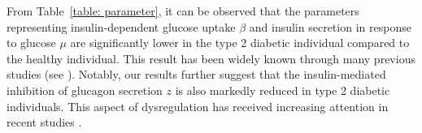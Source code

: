 \documentclass[a4paper,fleqn]{cas-sc}
\numberwithin{equation}{section}
\numberwithin{equation}{section}
\newcommand{\1}{\boldsymbol{1}}
\newcommand{\0}{\boldsymbol{0}}
\def\hat{\widehat}
\begin{document}
From Table~\ref{table: parameter}, it can be observed that the parameters representing insulin-dependent glucose uptake $\beta$ and insulin secretion in response to glucose $\mu$ are significantly lower in the type 2 diabetic individual compared to the healthy individual. This result has been widely known through many previous studies (see \cite{Ferrannini1998,Stumvoll2005,Taylor2012}). Notably, our results further suggest that the insulin-mediated inhibition of glucagon secretion $z$ is also markedly reduced in type 2 diabetic individuals. This aspect of dysregulation has received increasing attention in recent studies \cite{Ahren2009GPCRTargets,Ceriello2016GlucagonHeart,GodoyMatos2014GlucagonT2D,Gromada2018AlphaCell,UngerCherrington2012Glucagonocentric}.




    



\end{document}
